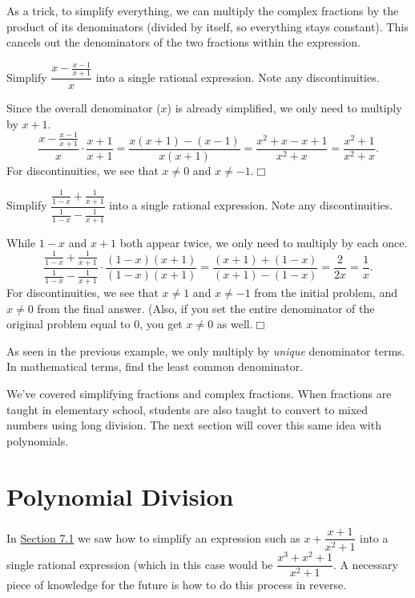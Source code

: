 \documentclass[../book.tex]{subfiles}
\begin{document}
As a trick, to simplify everything, we can multiply the complex fractions by the product of its denominators (divided by itself, so everything stays constant). This cancels out the denominators of the two fractions within the expression.
\begin{example}
Simplify $\dfrac{x-\frac{x-1}{x+1}}{x}$ into a single rational expression.  Note any discontinuities.
\end{example}
\begin{solution}
Since the overall denominator ($x$) is already simplified, we only need to multiply by $x+1$. $$\dfrac{x-\frac{x-1}{x+1}}{x}\cdot\dfrac{x+1}{x+1}=\dfrac{x(x+1)-(x-1)}{x(x+1)}=\dfrac{x^2+x-x+1}{x^2+x}=\dfrac{x^2+1}{x^2+x}.$$ For discontinuities, we see that $x\neq 0$ and $x\neq -1$.$\Box$
\end{solution}
\begin{example}
Simplify $\dfrac{\frac{1}{1-x}+\frac{1}{x+1}}{\frac{1}{1-x}-\frac{1}{x+1}}$ into a single rational expression.  Note any discontinuities.
\end{example}
\begin{solution}
While $1-x$ and $x+1$ both appear twice, we only need to multiply by each once.
$$\dfrac{\frac{1}{1-x}+\frac{1}{x+1}}{\frac{1}{1-x}-\frac{1}{x+1}}\cdot\dfrac{(1-x)(x+1)}{(1-x)(x+1)}=\dfrac{(x+1)+(1-x)}{(x+1)-(1-x)}=\dfrac{2}{2x}=\dfrac{1}{x}.$$ For discontinuities, we see that $x\neq 1$ and $x\neq -1$ from the initial problem, and $x\neq 0$ from the final answer.  (Also, if you set the entire denominator of the original problem equal to $0$, you get $x\neq 0$ as well.$\Box$
\end{solution}
\begin{remark}
As seen in the previous example, we only multiply by \textit{unique} denominator terms.  In mathematical terms, find the least common denominator.
\end{remark}
We've covered simplifying fractions and complex fractions.  When fractions are taught in elementary school, students are also taught to convert to mixed numbers using long division.  The next section will cover this same idea with polynomials.
\section{Polynomial Division}
\noindent In \hyperlink{section.7.1}{Section 7.1} we saw how to simplify an expression such as $x+\dfrac{x+1}{x^2+1}$ into a single rational expression (which in this case would be $\dfrac{x^3+x^2+1}{x^2+1}$. A necessary piece of knowledge for the future is how to do this process in reverse.
\end{document}
